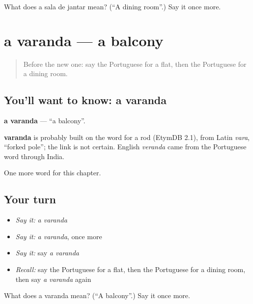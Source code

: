 \begin{tcolorbox}[breakable,colback=teal!4,colframe=teal!35!black,title={Before you move on}]
What does a sala de jantar mean? (\textquotedblleft{}A dining room\textquotedblright{}.) Say it once more.
\end{tcolorbox}
\section[a varanda]{a varanda — a balcony}

\label{lesson:PT-C157-varanda}



\begin{quote}
Before the new one: say the Portuguese for a flat, then the Portuguese for a dining room.
\end{quote}

\subsection*{You'll want to know: a varanda}
\textbf{a varanda} — \textquotedblleft{}a balcony\textquotedblright{}.

\begin{cousinweb}
\textbf{varanda} is probably built on the word for a rod (EtymDB 2.1), from Latin \emph{vara}, \textquotedblleft{}forked pole\textquotedblright{}; the link is not certain. English \emph{veranda} came from the Portuguese word through India.
\end{cousinweb}

\begin{grammarlens}[title={What you've built}]
One more word for this chapter.
\end{grammarlens}

\subsection*{Your turn}
\begin{itemize}
\raggedright
  \item \emph{Say it:} \emph{a varanda}
  \item \emph{Say it:} \emph{a varanda}, once more
  \item \emph{Say it:} say \emph{a varanda}
  \item \emph{Recall:} say the Portuguese for a flat, then the Portuguese for a dining room, then say \emph{a varanda} again
\end{itemize}

\begin{tcolorbox}[breakable,colback=teal!4,colframe=teal!35!black,title={Before you move on}]
What does a varanda mean? (\textquotedblleft{}A balcony\textquotedblright{}.) Say it once more.
\end{tcolorbox}
